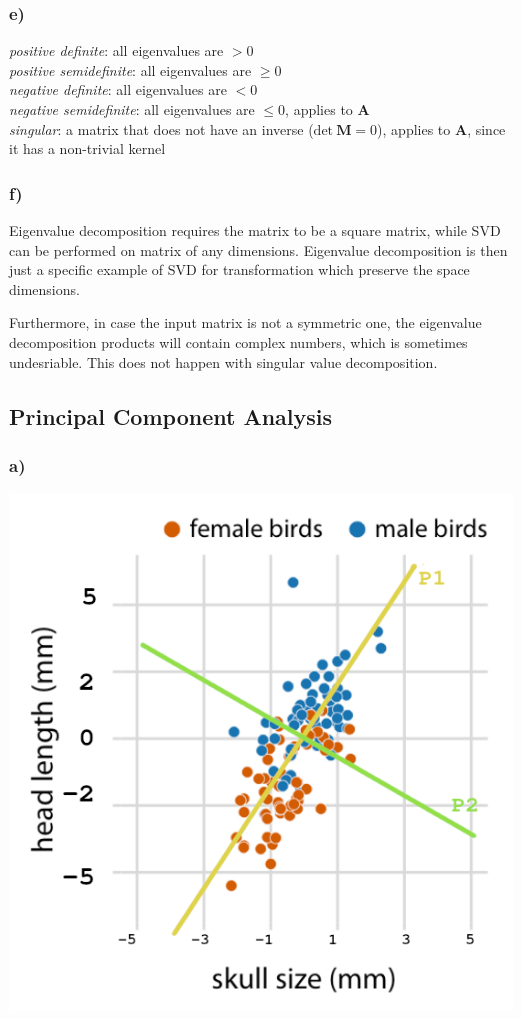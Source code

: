 \documentclass{article}
\begin{document}
\subsubsection*{e)}

\textit{positive definite}: all eigenvalues are $>0$ \\
\textit{positive semidefinite}: all eigenvalues are $\geq0$\\
\textit{negative definite}: all eigenvalues are $<0$ \\
\textit{negative semidefinite}: all eigenvalues are $\leq0$, applies to $\mathbf{A}$ \\
\textit{singular}: a matrix that does not have an inverse ($\text{det}\ \mathbf{M} = 0$), applies to $\mathbf{A}$, since it has a non-trivial kernel

\subsubsection*{f)}

Eigenvalue decomposition requires the matrix to be a square matrix, while SVD can be performed on matrix of any dimensions. Eigenvalue decomposition is then just a specific example of SVD for transformation which preserve the space dimensions.

Furthermore, in case the input matrix is not a symmetric one, the eigenvalue decomposition products will contain complex numbers, which is sometimes undesriable. This does not happen with singular value decomposition.

\subsection{Principal Component Analysis}

\subsubsection*{a)}

\begin{center}
    \includegraphics[width=0.75\linewidth]{img/fig2_centered.png}
\end{center}
\end{document}
